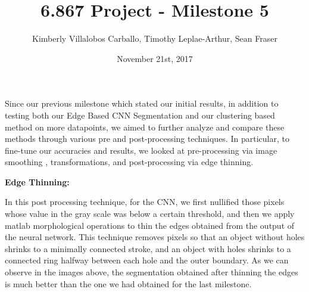 \documentclass[11pt, twoside]{article}
\title{6.867 Project - Milestone 5}
\date{November 21st, 2017}
\author {Kimberly Villalobos Carballo, Timothy Leplae-Arthur, Sean Fraser}
\begin{document}
\maketitle

Since our previous milestone which stated our initial results, in addition to testing both our Edge Based CNN Segmentation and our clustering based method on more datapoints, we aimed to further analyze and compare these methods through various pre and post-processing techniques. In particular, to fine-tune our accuracies and results, we looked at pre-processing via image smoothing \cite{Xu}, transformations, and post-processing via edge thinning. 

\textbf{Edge Thinning:}

In this post processing technique, for the CNN, we first nullified those pixels whose value in the gray scale was below a certain threshold, and then we apply matlab morphological operations to thin the edges obtained from the output of the neural network. This technique removes pixels so that an object without holes shrinks to a minimally connected stroke, and an object with holes shrinks to a connected ring halfway between each hole and the outer boundary. As we can observe in the images above, the segmentation obtained after thinning the edges is much better than the one we had obtained for the last milestone.
\end{document}
